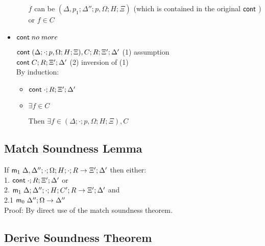 \begin{itemize}
\begin{itemize}
      $f$ can be $(\Delta, p_1; \Delta''; p, \Omega; H; \Xi)$ (which is contained in the original $\mathsf{cont} \;$)\\
      or $f \in C$\\
      
   \end{itemize}
   
   \item $\mathsf{cont} \; no \; more$
   
   $\mathsf{cont} \; (\Delta; \cdot; p, \Omega; H; \Xi), C; R; \Xi'; \Delta'$ \hfill (1) assumption \\
   $\mathsf{cont} \; C; R; \Xi'; \Delta'$ \hfill (2) inversion of (1) \\
   
   By induction:
   
   \begin{itemize}
      \item $\mathsf{cont} \; \cdot; R; \Xi'; \Delta'$
      
      \item $\exists f \in C$
      
      Then $\exists f \in (\Delta; \cdot; p, \Omega; H; \Xi), C$ \\
   \end{itemize}
   
\end{itemize}

\subsection{Match Soundness Lemma}

If $\mathsf{m}_1 \; \Delta, \Delta''; \cdot; \Omega; H; \cdot; R \rightarrow \Xi'; \Delta'$ then either:\\
1. \hspace{1cm} $\mathsf{cont} \; \cdot; R; \Xi'; \Delta'$ or \\
2. \hspace{1cm} $\mathsf{m}_1 \; \Delta; \Delta''; \cdot; H; C'; R \rightarrow \Xi'; \Delta'$ and\\
2.1 \hspace{2cm} $\mathsf{m}_0 \; \Delta''; \Omega \rightarrow \Delta''$\\

Proof: By direct use of the match soundness theorem.

\subsection{Derive Soundness Theorem}

